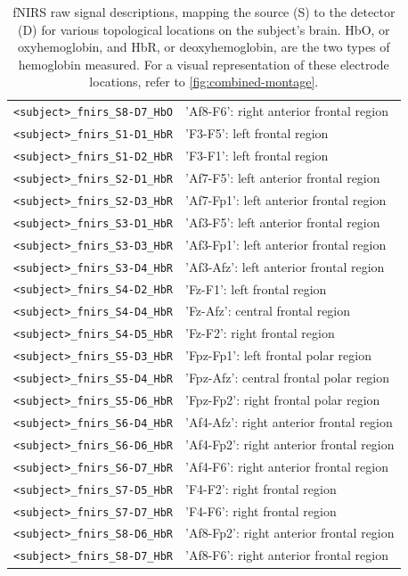 \begin{table}
\begin{tabularx}{\textwidth}{lX}
    \texttt{<subject>\_fnirs\_S8-D7\_HbO} & 'Af8-F6': right anterior frontal region  \\
    \texttt{<subject>\_fnirs\_S1-D1\_HbR} & 'F3-F5': left frontal region  \\
    \texttt{<subject>\_fnirs\_S1-D2\_HbR} & 'F3-F1': left frontal region  \\
    \texttt{<subject>\_fnirs\_S2-D1\_HbR} & 'Af7-F5': left anterior frontal region  \\
    \texttt{<subject>\_fnirs\_S2-D3\_HbR} & 'Af7-Fp1': left anterior frontal region  \\
    \texttt{<subject>\_fnirs\_S3-D1\_HbR} & 'Af3-F5': left anterior frontal region  \\
    \texttt{<subject>\_fnirs\_S3-D3\_HbR} & 'Af3-Fp1': left anterior frontal region  \\
    \texttt{<subject>\_fnirs\_S3-D4\_HbR} & 'Af3-Afz': left anterior frontal region  \\
    \texttt{<subject>\_fnirs\_S4-D2\_HbR} & 'Fz-F1': left frontal region  \\
    \texttt{<subject>\_fnirs\_S4-D4\_HbR} & 'Fz-Afz': central frontal region  \\
    \texttt{<subject>\_fnirs\_S4-D5\_HbR} & 'Fz-F2': right frontal region  \\
    \texttt{<subject>\_fnirs\_S5-D3\_HbR} & 'Fpz-Fp1': left frontal polar region  \\
    \texttt{<subject>\_fnirs\_S5-D4\_HbR} & 'Fpz-Afz': central frontal polar region  \\
    \texttt{<subject>\_fnirs\_S5-D6\_HbR} & 'Fpz-Fp2': right frontal polar region  \\
    \texttt{<subject>\_fnirs\_S6-D4\_HbR} & 'Af4-Afz': right anterior frontal region  \\
    \texttt{<subject>\_fnirs\_S6-D6\_HbR} & 'Af4-Fp2': right anterior frontal region  \\
    \texttt{<subject>\_fnirs\_S6-D7\_HbR} & 'Af4-F6': right anterior frontal region  \\
    \texttt{<subject>\_fnirs\_S7-D5\_HbR} & 'F4-F2': right frontal region  \\
    \texttt{<subject>\_fnirs\_S7-D7\_HbR} & 'F4-F6': right frontal region  \\
    \texttt{<subject>\_fnirs\_S8-D6\_HbR} & 'Af8-Fp2': right anterior frontal region  \\
    \texttt{<subject>\_fnirs\_S8-D7\_HbR} & 'Af8-F6': right anterior frontal region  \\
    \bottomrule
    \end{tabularx}
    \caption{%
        fNIRS raw signal descriptions, mapping the source (S) to the detector
        (D) for various topological locations on the subject's brain. HbO, or
        oxyhemoglobin, and HbR, or deoxyhemoglobin, are the two types of
        hemoglobin measured. For a visual representation of these electrode
        locations, refer to \autoref{fig:combined-montage}.
    }
    \label{tab:fNIRS_signals}
    \end{table}
